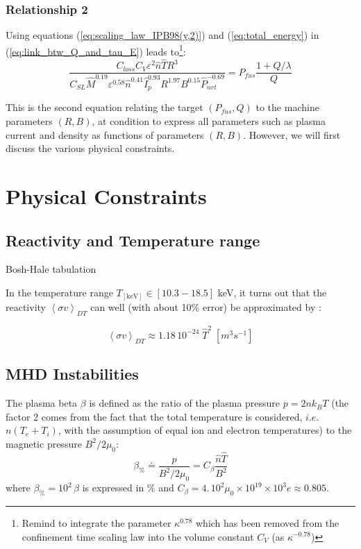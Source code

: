 \subsubsection{Relationship 2}
Using equations (\ref{eq:scaling_law_IPB98(y,2)}) and (\ref{eq:total_energy}) in (\ref{eq:link_btw_Q_and_tau_E}) leads to\footnote{Remind to integrate the parameter $\kappa^{0.78}$ which has been removed from the confinement time scaling law into the volume constant $C_V$ (as $\kappa^{-0.78}$)}:
\begin{equation}
	\frac
	{ C_{loss} C_V \varepsilon^2  \hat n \hat T R^3 }
	{C_{SL} \hat M^{0.19}  \varepsilon^{0.58} 
		\hat n^{0.41} \hat I_p^{0.93} R^{1.97} B^{0.15}  \hat P_{net}^{-0.69} }
	=
	P_{fus} \frac{1 + Q/\lambda}{Q}
\end{equation}

This is the second equation relating the target $(P_{fus}, Q)$ to the machine parameters $(R,B)$, at condition to express all parameters such as plasma current and density as functions of parameters $(R,B)$. However, we will first discuss the various physical constraints.

\section{Physical Constraints}
\subsection{Reactivity and Temperature range}
Bosh-Hale tabulation

In the temperature range $T_{\mathrm{[keV]}} \in [10.3-18.5]$ keV, it turns out that the reactivity $\left< \sigma v \right>_{DT}$ can well (with about 10$\%$ error) be approximated by \cite[(1.5.4)]{Wesson2004}: 

\begin{equation*}
\left< \sigma v \right>_{DT} \approx 1.18\, 10^{-24}\; \hat T^2 \;\si{\left[m^3 s^{-1}\right]}
\end{equation*}

\subsection{MHD Instabilities}
The plasma beta $\beta$ is defined as the ratio of the plasma pressure $p=2nk_BT$ (the factor 2 comes from the fact that the total temperature is considered, $i.e.$ $n(T_e+T_i)$, with the assumption of equal ion and electron temperatures) to the magnetic pressure $B^2/2\mu_0$:
\begin{equation}
\boxed{\beta_\% \doteq \frac{p}{B^2/2\mu_0}
	= C_\beta \frac{\hat n \hat T}{B^2}}
\label{eqn:beta}
\end{equation}
where $\beta_\%=10^2\, \beta$ is expressed in $\%$ and $C_\beta = 4.\,10^2\mu_0\times 10^{19}\times 10^3 e \approx 0.805$.

